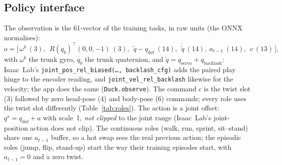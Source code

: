 \documentclass[11pt]{article}
\newcommand{\code}[1]{\texttt{\small #1}}
\newcommand{\tab}[1]{Table~\ref{tab:#1}}
\begin{document}
\subsection{Policy interface}
The observation is the 61-vector of the training tasks, in raw units (the ONNX normalises):
\begin{equation}
  o = \big[\,\omega^{b}\ (3),\ \ R(q_{b})^{\!\top}(0,0,-1)\ (3),\ \ \tilde q - q_{\text{def}}\ (14),\ \ \dot{\tilde q}\ (14),\
  a_{t-1}\ (14),\ \ c\ (13)\,\big],
\end{equation}
with $\omega^b$ the trunk gyro, $q_b$ the trunk quaternion, and $\tilde q = q_{\text{servo}} + q_{\text{backlash}}$:
Isaac~Lab's \code{joint\_pos\_rel\_biased(\ldots, backlash\_cfg)} adds the paired play hinge to the encoder reading,
and \code{joint\_vel\_rel\_backlash} likewise for the velocity; the app does the same (\code{Duck.observe}). The
command $c$ is the twist slot (3) followed by zero head-pose (4) and body-pose (6) commands; every role uses the
twist slot differently (\tab{roles}). The action is a joint offset: $q^\star = q_{\text{def}} + a$ with scale~1,
\emph{not clipped} to the joint range (Isaac~Lab's joint-position action does not clip). The continuous roles
(walk, run, sprint, sit--stand) share one $a_{t-1}$ buffer, so a hot swap sees the real previous action; the
episodic roles (jump, flip, stand-up) start the way their training episodes start, with $a_{t-1}=0$ and a zero
twist.
\end{document}
